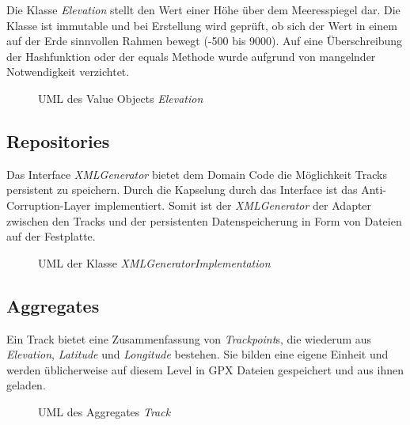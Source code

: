 Die Klasse \textit{Elevation} stellt den Wert einer Höhe über dem Meeresspiegel dar. Die Klasse ist immutable und bei Erstellung wird geprüft, ob sich der Wert in einem auf der Erde sinnvollen Rahmen bewegt (-500 bis 9000). 
Auf eine Überschreibung der Hashfunktion oder der equals Methode wurde aufgrund von mangelnder Notwendigkeit verzichtet.

\begin{figure}[H]
  \centering
  
  \caption{UML des Value Objects \textit{Elevation}}
\end{figure}

\subsection{Repositories}

Das Interface \textit{XMLGenerator} bietet dem Domain Code die Möglichkeit Tracks persistent zu speichern. Durch die Kapselung durch das Interface ist das Anti-Corruption-Layer implementiert.
Somit ist der \textit{XMLGenerator} der Adapter zwischen den Tracks und der persistenten Datenspeicherung in Form von Dateien auf der Festplatte.

\begin{figure}[H]
  \centering
  
  \caption{UML der Klasse \textit{XMLGeneratorImplementation}}
\end{figure}

\subsection{Aggregates}

Ein Track bietet eine Zusammenfassung von \textit{Trackpoint}s, die wiederum aus \textit{Elevation}, \textit{Latitude} und \textit{Longitude} bestehen. Sie bilden eine eigene Einheit und werden üblicherweise auf diesem Level in GPX Dateien gespeichert und aus ihnen geladen.

\begin{figure}[H]
  \centering
  
  \caption{UML des Aggregates \textit{Track}}
\end{figure}